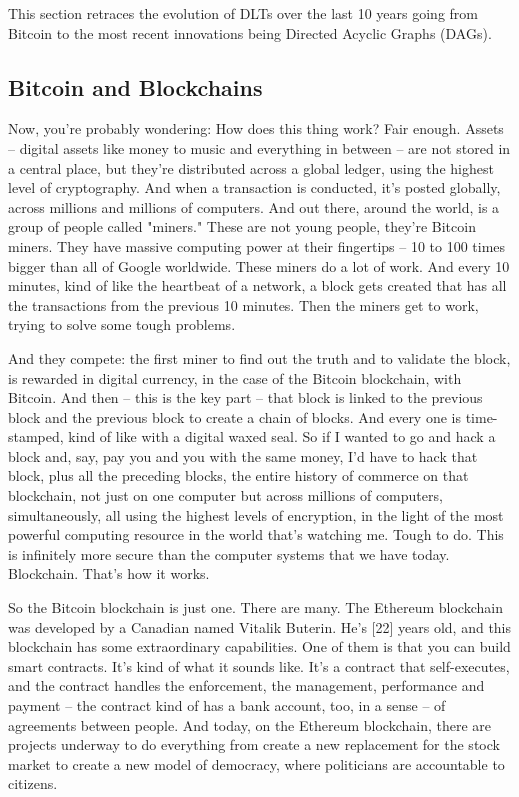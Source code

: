 \documentclass[a4paper]{article}
\begin{document}
This section retraces the evolution of DLTs over the last 10 years going from Bitcoin to the most recent innovations being Directed Acyclic Graphs (DAGs).  

\subsection{Bitcoin and Blockchains}

Now, you're probably wondering: How does this thing work? Fair enough. Assets -- digital assets like money to music and everything in between -- are not stored in a central place, but they're distributed across a global ledger, using the highest level of cryptography. And when a transaction is conducted, it's posted globally, across millions and millions of computers. And out there, around the world, is a group of people called "miners." These are not young people, they're Bitcoin miners. They have massive computing power at their fingertips -- 10 to 100 times bigger than all of Google worldwide. These miners do a lot of work. And every 10 minutes, kind of like the heartbeat of a network, a block gets created that has all the transactions from the previous 10 minutes. Then the miners get to work, trying to solve some tough problems.

And they compete: the first miner to find out the truth and to validate the block, is rewarded in digital currency, in the case of the Bitcoin blockchain, with Bitcoin. And then -- this is the key part -- that block is linked to the previous block and the previous block to create a chain of blocks. And every one is time-stamped, kind of like with a digital waxed seal. So if I wanted to go and hack a block and, say, pay you and you with the same money, I'd have to hack that block, plus all the preceding blocks, the entire history of commerce on that blockchain, not just on one computer but across millions of computers, simultaneously, all using the highest levels of encryption, in the light of the most powerful computing resource in the world that's watching me. Tough to do. This is infinitely more secure than the computer systems that we have today. Blockchain. That's how it works.

So the Bitcoin blockchain is just one. There are many. The Ethereum blockchain was developed by a Canadian named Vitalik Buterin. He's [22] years old, and this blockchain has some extraordinary capabilities. One of them is that you can build smart contracts. It's kind of what it sounds like. It's a contract that self-executes, and the contract handles the enforcement, the management, performance and payment -- the contract kind of has a bank account, too, in a sense -- of agreements between people. And today, on the Ethereum blockchain, there are projects underway to do everything from create a new replacement for the stock market to create a new model of democracy, where politicians are accountable to citizens.
\end{document}
